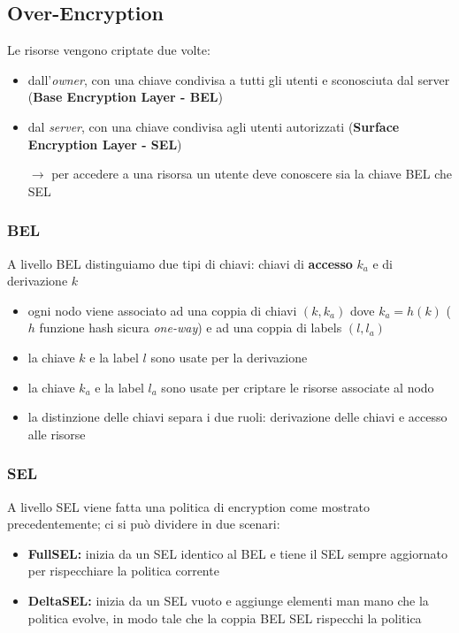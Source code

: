 \documentclass{report}
\begin{document}
\subsection{Over-Encryption}
Le risorse vengono criptate due volte:
\begin{itemize}
    \item dall'\textit{owner}, con una chiave condivisa a tutti gli utenti e sconosciuta dal server (\textbf{Base Encryption Layer - BEL})
    \item dal \textit{server}, con una chiave condivisa agli utenti autorizzati (\textbf{Surface Encryption Layer - SEL})
    
    $\rightarrow$ per accedere a una risorsa un utente deve conoscere sia la chiave BEL che SEL
\end{itemize}

\subsubsection{BEL}
A livello BEL distinguiamo due tipi di chiavi: chiavi di \textbf{accesso} $k_a$ e di derivazione $k$
\begin{itemize}
    \item ogni nodo viene associato ad una coppia di chiavi $(k, k_a)$ dove $k_a=h(k)$ ($h$ funzione hash sicura \textit{one-way}) e 
    ad una coppia di labels $(l, l_a)$
    \item la chiave $k$ e la label $l$ sono usate per la derivazione 
    \item la chiave $k_a$ e la label $l_a$ sono usate per criptare le risorse associate al nodo 
    \item la distinzione delle chiavi separa i due ruoli: derivazione delle chiavi e accesso alle risorse
\end{itemize}

\subsubsection{SEL}
A livello SEL viene fatta una politica di encryption come mostrato precedentemente; ci 
si può dividere in due scenari:
\begin{itemize}
    \item \textbf{Full\underbar{}SEL:} inizia da un SEL identico al BEL e tiene il SEL sempre aggiornato per rispecchiare la politica corrente
    \item \textbf{Delta\underbar{}SEL:} inizia da un SEL vuoto e aggiunge elementi man mano che la politica evolve, in modo tale che la coppia BEL SEL rispecchi la politica
\end{itemize}
\end{document}
